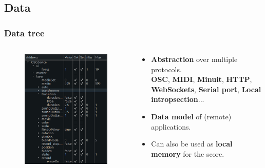 \documentclass{beamer}
\begin{document}
\subsection{Data}
\begin{frame}
    \frametitle{Data tree}  
    \Large
    
    \begin{columns}
        \begin{column}{0.40\textwidth}
            \begin{figure}
                \includegraphics[width=\textwidth]{images/device.png}
            \end{figure}
        \end{column}
        \begin{column}{0.55\textwidth}
            \begin{itemize}
                \item \textbf{Abstraction} over multiple protocols.~\\{\small \textbf{OSC}, \textbf{MIDI}, \textbf{Minuit}, \textbf{HTTP}, \textbf{WebSockets}, \textbf{Serial port}, \textbf{Local intropsection}}...
                \item \textbf{Data model} of (remote) applications.
                \item Can also be used as \textbf{local memory} for the score.
            \end{itemize}
        \end{column}
    \end{columns}
\end{frame}
\end{document}
